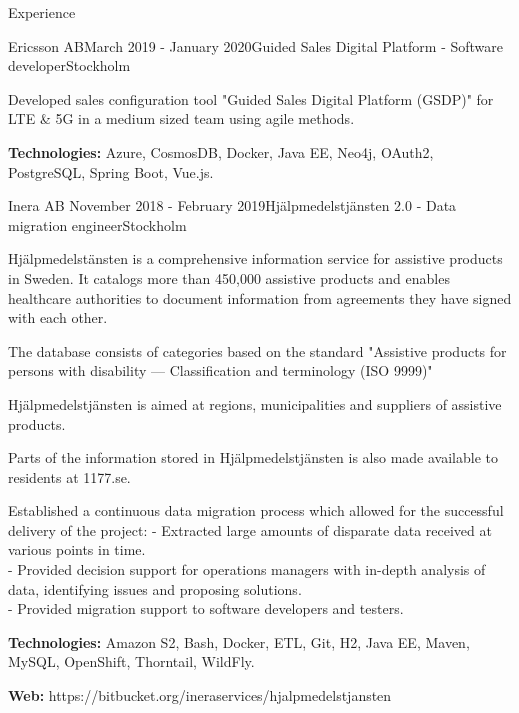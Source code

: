 \documentclass{resume}
\begin{document}
\begin{rSection}{Experience}
    \begin{rSubsection}{Ericsson AB}{March 2019 - January 2020}{Guided Sales Digital Platform - Software developer}{Stockholm}
      \item Developed sales configuration tool "Guided Sales Digital Platform (GSDP)" for LTE \& 5G in a medium sized team using agile methods.
      \item \textbf{Technologies:} Azure, CosmosDB, Docker, Java EE, Neo4j, OAuth2, PostgreSQL, Spring Boot, Vue.js.
    \end{rSubsection}

    \begin{rSubsection}{Inera AB }{November 2018 - February 2019}{Hjälpmedelstjänsten 2.0 - Data migration engineer}{Stockholm}
      \item Hjälpmedelstänsten is a comprehensive information service for assistive products in Sweden.
      It catalogs more than 450,000 assistive products and enables healthcare authorities to document
      information from agreements they have signed with each other.
      \item The database consists of categories based on the standard "Assistive products for persons with disability — Classification and terminology (ISO 9999)"
      \item Hjälpmedelstjänsten is aimed at regions, municipalities and suppliers of assistive products.
      \item Parts of the information stored in Hjälpmedelstjänsten is also made available to residents at 1177.se.
      \item Established a continuous data migration process which allowed for the successful delivery of the project:
       - Extracted large amounts of disparate data received at various points in time. \\
       - Provided decision support for operations managers with in-depth analysis of data, identifying issues and proposing solutions. \\
       - Provided migration support to software developers and testers.
      \item \textbf{Technologies:} Amazon S2, Bash, Docker, ETL, Git, H2, Java EE, Maven, MySQL, OpenShift, Thorntail, WildFly.
      \item \textbf{Web:} https://bitbucket.org/ineraservices/hjalpmedelstjansten
    \end{rSubsection}


\end{rSection}
\end{document}
